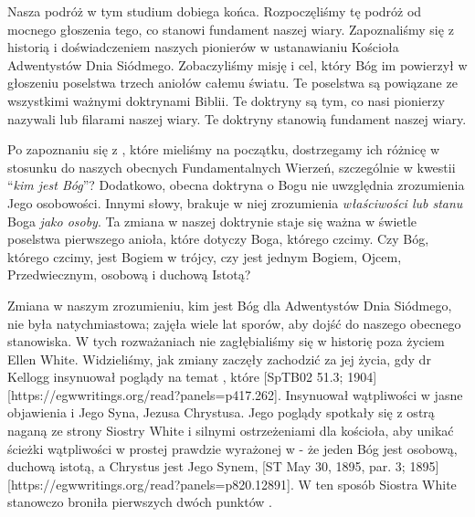
Nasza podróż w tym studium dobiega końca. Rozpoczęliśmy tę podróż od mocnego głoszenia tego, co stanowi fundament naszej wiary. Zapoznaliśmy się z historią i doświadczeniem naszych pionierów w ustanawianiu Kościoła Adwentystów Dnia Siódmego. Zobaczyliśmy misję i cel, który Bóg im powierzył w głoszeniu poselstwa trzech aniołów całemu światu. Te poselstwa są powiązane ze wszystkimi ważnymi doktrynami Biblii. Te doktryny są tym, co nasi pionierzy nazywali  lub filarami naszej wiary. Te doktryny stanowią fundament naszej wiary.

Po zapoznaniu się z , które mieliśmy na początku, dostrzegamy ich różnicę w stosunku do naszych obecnych Fundamentalnych Wierzeń, szczególnie w kwestii “\textit{kim jest Bóg}”? Dodatkowo, obecna doktryna o Bogu nie uwzględnia zrozumienia Jego osobowości. Innymi słowy, brakuje w niej zrozumienia \textit{właściwości lub stanu} Boga \textit{jako osoby}. Ta zmiana w naszej doktrynie staje się ważna w świetle poselstwa pierwszego anioła, które dotyczy Boga, którego czcimy. Czy Bóg, którego czcimy, jest Bogiem w trójcy, czy jest jednym Bogiem, Ojcem, Przedwiecznym, osobową i duchową Istotą?

Zmiana w naszym zrozumieniu, kim jest Bóg dla Adwentystów Dnia Siódmego, nie była natychmiastowa; zajęła wiele lat sporów, aby dojść do naszego obecnego stanowiska. W tych rozważaniach nie zagłębialiśmy się w historię poza życiem Ellen White. Widzieliśmy, jak zmiany zaczęły zachodzić za jej życia, gdy dr Kellogg insynuował poglądy na temat , które [SpTB02 51.3; 1904][https://egwwritings.org/read?panels=p417.262]. Insynuował wątpliwości w jasne objawienia  i Jego Syna, Jezusa Chrystusa. Jego poglądy spotkały się z ostrą naganą ze strony Siostry White i silnymi ostrzeżeniami dla kościoła, aby unikać ścieżki wątpliwości w prostej prawdzie wyrażonej w  - że jeden Bóg jest osobową, duchową istotą, a Chrystus jest Jego Synem, [ST May 30, 1895, par. 3; 1895][https://egwwritings.org/read?panels=p820.12891]. W ten sposób Siostra White stanowczo broniła pierwszych dwóch punktów .

